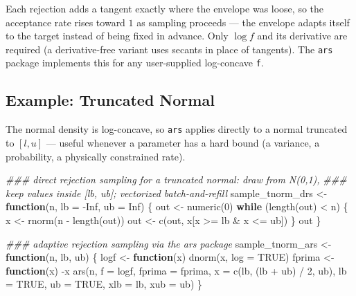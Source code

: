 \documentclass[
  letterpaper,
  DIV=11,
  numbers=noendperiod]{scrreprt}
\newenvironment{Shaded}{\begin{snugshade}}{\end{snugshade}}
\newcommand{\AttributeTok}[1]{\textcolor[rgb]{0.40,0.45,0.13}{#1}}
\newcommand{\ConstantTok}[1]{\textcolor[rgb]{0.56,0.35,0.01}{#1}}
\newcommand{\ControlFlowTok}[1]{\textcolor[rgb]{0.00,0.23,0.31}{\textbf{#1}}}
\newcommand{\DecValTok}[1]{\textcolor[rgb]{0.68,0.00,0.00}{#1}}
\newcommand{\DocumentationTok}[1]{\textcolor[rgb]{0.37,0.37,0.37}{\textit{#1}}}
\newcommand{\FunctionTok}[1]{\textcolor[rgb]{0.28,0.35,0.67}{#1}}
\newcommand{\NormalTok}[1]{\textcolor[rgb]{0.00,0.23,0.31}{#1}}
\newcommand{\OtherTok}[1]{\textcolor[rgb]{0.00,0.23,0.31}{#1}}
\newcommand{\SpecialCharTok}[1]{\textcolor[rgb]{0.37,0.37,0.37}{#1}}
\begin{document}
Each rejection adds a tangent exactly where the envelope was loose, so
the acceptance rate rises toward \(1\) as sampling proceeds --- the
envelope adapts itself to the target instead of being fixed in advance.
Only \(\log f\) and its derivative are required (a derivative-free
variant uses secants in place of tangents). The \texttt{ars} package
implements this for any user-supplied log-concave \texttt{f}.

\subsection{Example: Truncated Normal}\label{example-truncated-normal}

The normal density is log-concave, so \texttt{ars} applies directly to a
normal truncated to \([l, u]\) --- useful whenever a parameter has a
hard bound (a variance, a probability, a physically constrained rate).

\begin{Shaded}
\begin{Highlighting}[]
\DocumentationTok{\#\#\# direct rejection sampling for a truncated normal: draw from N(0,1),}
\DocumentationTok{\#\#\# keep values inside [lb, ub]; vectorized batch{-}and{-}refill}
\NormalTok{sample\_tnorm\_drs }\OtherTok{\textless{}{-}} \ControlFlowTok{function}\NormalTok{(n, }\AttributeTok{lb =} \SpecialCharTok{{-}}\ConstantTok{Inf}\NormalTok{, }\AttributeTok{ub =} \ConstantTok{Inf}\NormalTok{) \{}
\NormalTok{    out }\OtherTok{\textless{}{-}} \FunctionTok{numeric}\NormalTok{(}\DecValTok{0}\NormalTok{)}
    \ControlFlowTok{while}\NormalTok{ (}\FunctionTok{length}\NormalTok{(out) }\SpecialCharTok{\textless{}}\NormalTok{ n) \{}
\NormalTok{        x }\OtherTok{\textless{}{-}} \FunctionTok{rnorm}\NormalTok{(n }\SpecialCharTok{{-}} \FunctionTok{length}\NormalTok{(out))}
\NormalTok{        out }\OtherTok{\textless{}{-}} \FunctionTok{c}\NormalTok{(out, x[x }\SpecialCharTok{\textgreater{}=}\NormalTok{ lb }\SpecialCharTok{\&}\NormalTok{ x }\SpecialCharTok{\textless{}=}\NormalTok{ ub])}
\NormalTok{    \}}
\NormalTok{    out}
\NormalTok{\}}

\DocumentationTok{\#\#\# adaptive rejection sampling via the ars package}
\NormalTok{sample\_tnorm\_ars }\OtherTok{\textless{}{-}} \ControlFlowTok{function}\NormalTok{(n, lb, ub) \{}
\NormalTok{    logf }\OtherTok{\textless{}{-}} \ControlFlowTok{function}\NormalTok{(x) }\FunctionTok{dnorm}\NormalTok{(x, }\AttributeTok{log =} \ConstantTok{TRUE}\NormalTok{)}
\NormalTok{    fprima }\OtherTok{\textless{}{-}} \ControlFlowTok{function}\NormalTok{(x) }\SpecialCharTok{{-}}\NormalTok{x}
    \FunctionTok{ars}\NormalTok{(n, }\AttributeTok{f =}\NormalTok{ logf, }\AttributeTok{fprima =}\NormalTok{ fprima, }\AttributeTok{x =} \FunctionTok{c}\NormalTok{(lb, (lb }\SpecialCharTok{+}\NormalTok{ ub) }\SpecialCharTok{/} \DecValTok{2}\NormalTok{, ub),}
        \AttributeTok{lb =} \ConstantTok{TRUE}\NormalTok{, }\AttributeTok{ub =} \ConstantTok{TRUE}\NormalTok{, }\AttributeTok{xlb =}\NormalTok{ lb, }\AttributeTok{xub =}\NormalTok{ ub)}
\NormalTok{\}}
\end{Highlighting}
\end{Shaded}
\end{document}
